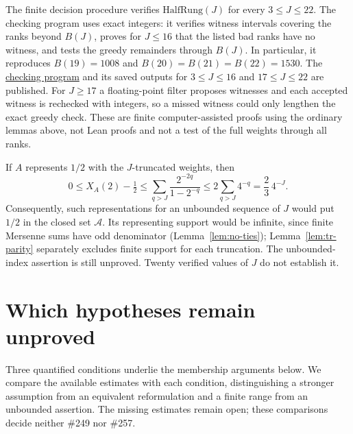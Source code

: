 \begin{rem}
The finite decision procedure verifies $\mathrm{HalfRung}(J)$ for every
$3\le J\le22$.  The checking program uses exact integers: it verifies
witness intervals covering the ranks beyond $B(J)$, proves for $J\le16$
that the listed bad ranks have no witness, and tests the greedy remainders
through $B(J)$.  In particular, it reproduces $B(19)=1008$ and
$B(20)=B(21)=B(22)=1530$.
The
\href{https://github.com/wcook04/plectis-erdos/blob/f757115e03bebe5c04431a147da559015c680a37/research/experiments/erdos257/check_truncation_rung_ladder.py}{checking program}
and its saved outputs for
\href{https://github.com/wcook04/plectis-erdos/blob/f757115e03bebe5c04431a147da559015c680a37/research/experiments/erdos257/receipts/truncation-ladder-3-16.json}{$3\le J\le16$}
and
\href{https://github.com/wcook04/plectis-erdos/blob/f757115e03bebe5c04431a147da559015c680a37/research/experiments/erdos257/receipts/truncation-ladder-17-22.json}{$17\le J\le22$}
are published.  For $J\ge17$ a floating-point filter proposes witnesses
and each accepted witness is rechecked with integers, so a missed witness
could only lengthen the exact greedy check.  These are finite
computer-assisted proofs using the ordinary lemmas above, not Lean
proofs and not a test of the full weights through all ranks.

If $A$ represents $1/2$ with the $J$-truncated weights, then
\[
 0\le X_A(2)-\tfrac12
 \le\sum_{q>J}\frac{2^{-2q}}{1-2^{-q}}
 \le2\sum_{q>J}4^{-q}=\frac23\,4^{-J}.
\]
Consequently, such representations for an unbounded sequence of $J$
would put $1/2$ in the closed set $\mathcal A$.  Its representing support
would be infinite, since finite Mersenne sums have odd denominator
(Lemma~\ref{lem:no-ties}); Lemma~\ref{lem:tr-parity} separately excludes
finite support for each truncation.  The unbounded-index assertion is
still unproved.  Twenty verified values of $J$ do not establish it.
\end{rem}
\section{Which hypotheses remain unproved}
Three quantified conditions underlie the membership arguments below.
We compare the available estimates with each condition, distinguishing
a stronger assumption from an equivalent reformulation and a finite
range from an unbounded assertion. The missing estimates remain open;
these comparisons decide neither \#249 nor \#257.

